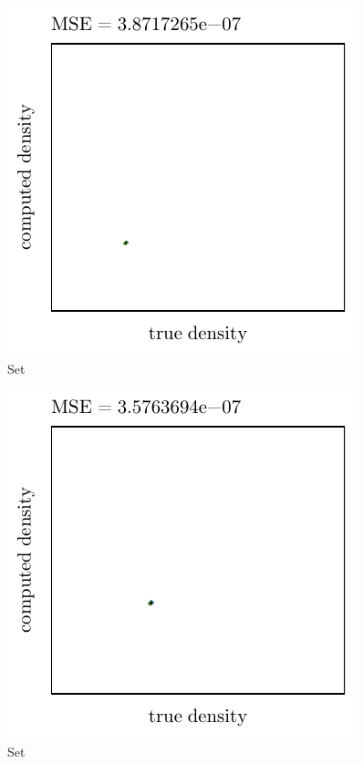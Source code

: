 \begin{subfigure}{0.3\textwidth}
	\centering
	\includegraphics[keepaspectratio=true, width=\textwidth, height=0.23\textheight]{4/img/results_baakman_5_60000_mbe_breiman.pdf}
	\caption{Set \baakmanFive}
	\label{fig:4:simulated:datasets:mbe:baakman5}
\end{subfigure}		
\begin{subfigure}{0.3\textwidth}
	\centering
	\includegraphics[keepaspectratio=true, width=\textwidth, height=0.23\textheight]{4/img/results_baakman_1_60000_mbe_breiman.pdf}
	\caption{Set \baakmanOne}
	\label{fig:4:simulated:datasets:mbe:baakman1}
\end{subfigure}
